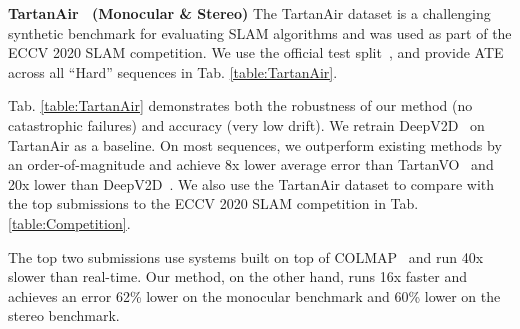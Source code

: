 \documentclass{article}
\begin{document}

\noindent \textbf{TartanAir~\cite{tartanair} (Monocular \& Stereo)} The TartanAir dataset is a challenging synthetic benchmark for evaluating SLAM algorithms and was used as part of the ECCV 2020 SLAM competition. We use the official test split~\cite{tartanair}, and provide ATE across all ``Hard'' sequences in Tab. \ref{table:TartanAir}.

Tab. \ref{table:TartanAir} demonstrates both the robustness of our method (no catastrophic failures) and accuracy (very low drift). We retrain DeepV2D~\cite{deepv2d} on TartanAir as a baseline. On most sequences, we outperform existing methods by an order-of-magnitude and achieve 8x lower average error than TartanVO~\cite{tartanvo} and 20x lower than DeepV2D~\cite{deepv2d}. We also use the TartanAir dataset to compare with the top submissions to the ECCV 2020 SLAM competition in Tab. \ref{table:Competition}.
\begin{table} [h]
\centering
{}
\caption{Results on the TartanAir test set, compared with the top 3 submission to the ECCV 2020 SLAM competition. The score is computed using normalized relative pose error for all possible sequences of length $\{5,10,15,...,40\}$ meters, see competition page for details.}
\label{table:Competition}
\end{table}
The top two submissions use systems built on top of COLMAP~\cite{colmap} and run 40x slower than real-time. Our method, on the other hand, runs 16x faster and achieves an error 62\% lower on the monocular benchmark and 60\% lower on the stereo benchmark.
\end{document}
